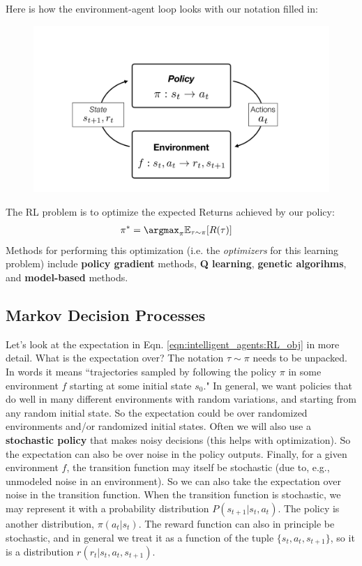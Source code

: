 Here is how the environment-agent loop looks with our notation filled in:
\begin{figure}[h]
    \centering
    \includegraphics[width=0.6\linewidth]{./figures/intelligent_agents/env_agent_loop_with_notation.pdf}
    \label{fig:env_agent_loop_with_notation}
\end{figure}

The RL problem is to optimize the expected Returns achieved by our policy:
\begin{align}
    \pi^* &= \argmax_{\pi} \mathbb{E}_{\tau \sim \pi} [R(\tau)] \label{eqn:intelligent_agents:RL_obj}
\end{align}
Methods for performing this optimization (i.e. the \emph{optimizers} for this learning problem) include {\bf policy gradient} methods, {\bf Q learning}, {\bf genetic algorihms}, and {\bf model-based} methods.

\subsection{Markov Decision Processes}
Let's look at the expectation in Eqn. \ref{eqn:intelligent_agents:RL_obj} in more detail. What is the expectation over? The notation $\tau \sim \pi$ needs to be unpacked. In words it means ``trajectories sampled by following the policy $\pi$ in some environment $f$ starting at some initial state $s_0$." In general, we want policies that do well in many different environments with random variations, and starting from any random initial state. So the expectation could be over randomized environments and/or randomized initial states. Often we will also use a {\bf stochastic policy} that makes noisy decisions (this helps with optimization). So the expectation can also be over noise in the policy outputs. Finally, for a given environment $f$, the transition function may itself be stochastic (due to, e.g., unmodeled noise in an environment). So we can also take the expectation over noise in the transition function. When the transition function is stochastic, we may represent it with a probability distribution $P(s_{t+1} | s_t, a_t)$. The policy is another distribution, $\pi(a_t | s_t)$. The reward function can also in principle be stochastic, and in general we treat it as a function of the tuple $\{s_t, a_t, s_{t+1}\}$, so it is a distribution $r(r_t | s_t, a_t, s_{t+1})$.

